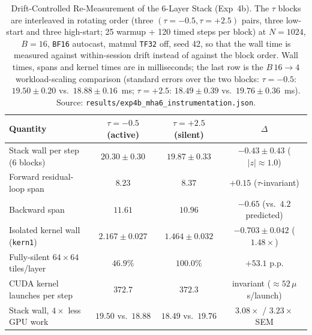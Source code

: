 \documentclass[11pt,a4paper]{article}
\begin{document}
\begin{table}[ht!]
\centering
\caption{Drift-Controlled Re-Measurement of the 6-Layer Stack (Exp~4b). The $\tau$ blocks are interleaved in rotating order (three $(\tau{=}-0.5, \tau{=}{+}2.5)$ pairs, three low-start and three high-start; 25 warmup + 120 timed steps per block) at $N{=}1024$, $B{=}16$, \texttt{BF16} autocast, matmul \texttt{TF32} off, seed 42, so that the wall time is measured against within-session drift instead of against the block order. Wall times, spans and kernel times are in milliseconds; the last row is the $B\,16 \to 4$ workload-scaling comparison (standard errors over the two blocks: $\tau{=}-0.5$: $19.50 \pm 0.20$ vs.\ $18.88 \pm 0.16$~ms; $\tau{=}+2.5$: $18.49 \pm 0.39$ vs.\ $19.76 \pm 0.36$~ms). Source: \texttt{results/exp4b\_mha6\_instrumentation.json}.}
\label{tab:drift-ctrl}
\scriptsize
\setlength{\tabcolsep}{1.8pt}
\begin{tabular}{lccc}
\toprule
Quantity & $\tau = -0.5$ (active) & $\tau = +2.5$ (silent) & $\Delta$ \\
\midrule
Stack wall per step (6 blocks) & $20.30 \pm 0.30$ & $19.87 \pm 0.33$ & $-0.43 \pm 0.43$ ($|z| \approx 1.0$) \\
Forward residual-loop span & $8.23$ & $8.37$ & $+0.15$ ($\tau$-invariant) \\
Backward span & $11.61$ & $10.96$ & $-0.65$ (vs.\ $4.2$ predicted) \\
Isolated kernel wall (\texttt{kern1}) & $2.167 \pm 0.027$ & $1.464 \pm 0.032$ & $-0.703 \pm 0.042$ ($1.48\times$) \\
Fully-silent $64{\times}64$ tiles/layer & $46.9\%$ & $100.0\%$ & $+53.1$ p.p. \\
CUDA kernel launches per step & $372.7$ & $372.3$ & invariant ($\approx 52\,\mu$s/launch) \\
Stack wall, $4\times$ less GPU work & $19.50$ vs.\ $18.88$ & $18.49$ vs.\ $19.76$ & $3.08\times$ / $3.23\times$ SEM \\
\bottomrule
\end{tabular}
\end{table}
\end{document}
